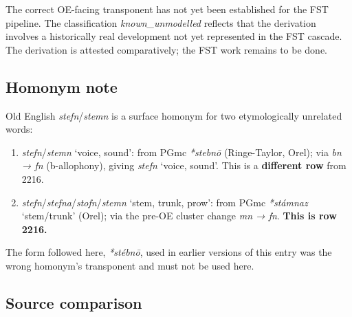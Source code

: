 \documentclass[
  british,
  a4paper,
  openany]{book}
\providecommand{\tightlist}{%
  \setlength{\itemsep}{0pt}\setlength{\parskip}{0pt}}
\providecommand{\Recon}[1]{\emph{*#1}}
{\catcode`→=\active \global\def→{\ensuremath{\rightarrow}}}
\providecommand{\Recon}[1]{\emph{*#1}}
{\catcode`→=\active \global\def→{\ensuremath{\rightarrow}}}
\begin{document}
The correct OE-facing transponent has not yet been established for the
FST pipeline. The classification \emph{known\_unmodelled} reflects that
the derivation involves a historically real development not yet
represented in the FST cascade. The derivation is attested
comparatively; the FST work remains to be done.

\subsection{Homonym note}\label{homonym-note}

Old English \emph{stefn}/\emph{stemn} is a surface homonym for two
etymologically unrelated words:

\begin{enumerate}
\def\labelenumi{\arabic{enumi}.}
\tightlist
\item
  \emph{stefn}/\emph{stemn} `voice, sound': from PGmc \emph{*stebnō}
  (Ringe-Taylor, Orel); via \emph{bn → fn} (b-allophony), giving
  \emph{stefn} `voice, sound'. This is a \textbf{different row} from
  2216.
\item
  \emph{stefn}/\emph{stefna}/\emph{stofn}/\emph{stemn} `stem, trunk,
  prow': from PGmc \Recon{stámnaz} `stem/trunk' (Orel); via the pre-OE
  cluster change \emph{mn → fn}. \textbf{This is row 2216.}
\end{enumerate}

The form followed here, \emph{*stébnō}, used in earlier versions of this
entry was the wrong homonym's transponent and must not be used here.

\subsection{Source comparison}\label{source-comparison}
\end{document}
